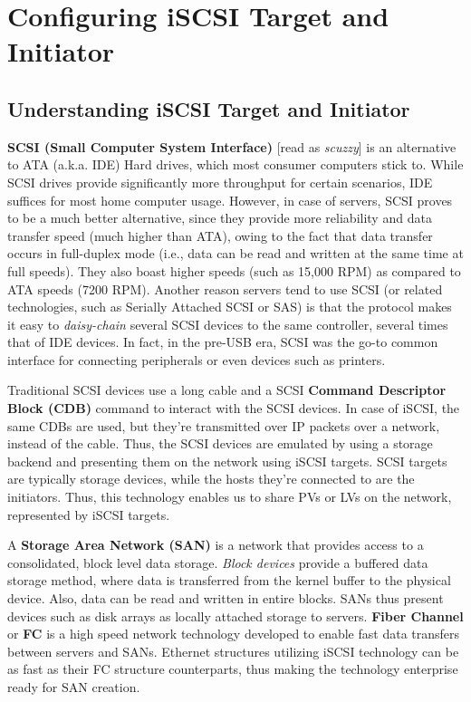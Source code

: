 \chapter{Configuring iSCSI Target and Initiator}

\section{Understanding iSCSI Target and Initiator}
\textbf{SCSI (Small Computer System Interface)} [read as \textit{scuzzy}] is an alternative to ATA (a.k.a. IDE) Hard drives, which most consumer computers stick to. While SCSI drives provide significantly more throughput for certain scenarios, IDE suffices for most home computer usage. However, in case of servers, SCSI proves to be a much better alternative, since they provide more reliability and data transfer speed (much higher than ATA), owing to the fact that data transfer occurs in full-duplex mode (i.e., data can be read and written at the same time at full speeds). They also boast higher speeds (such as 15,000 RPM) as compared to ATA speeds (7200 RPM). Another reason servers tend to use SCSI (or related technologies, such as Serially Attached SCSI or SAS) is that the protocol makes it easy to \textit{daisy-chain} several SCSI devices to the same controller, several times that of IDE devices. In fact, in the pre-USB era, SCSI was the go-to common interface for connecting peripherals or even devices such as printers. 

Traditional SCSI devices use a long cable and a SCSI \textbf{Command Descriptor Block (CDB)} command to interact with the SCSI devices. In case of iSCSI, the same CDBs are used, but they're transmitted over IP packets over a network, instead of the cable. Thus, the SCSI devices are emulated by using a storage backend and presenting them on the network using iSCSI targets. SCSI targets are typically storage devices, while the hosts they're connected to are the initiators. Thus, this technology enables us to share PVs or LVs on the network, represented by iSCSI targets. 

A \textbf{Storage Area Network (SAN)} is a network that provides access to a consolidated, block level data storage. \textit{Block devices} provide a buffered data storage method, where data is transferred from the kernel buffer to the physical device. Also, data can be read and written in entire blocks. SANs thus present devices such as disk arrays as locally attached storage to servers. \textbf{Fiber Channel} or \textbf{FC} is a high speed network technology developed to enable fast data transfers between servers and SANs. Ethernet structures utilizing iSCSI technology can be as fast as their FC structure counterparts, thus making the technology enterprise ready for SAN creation. 

